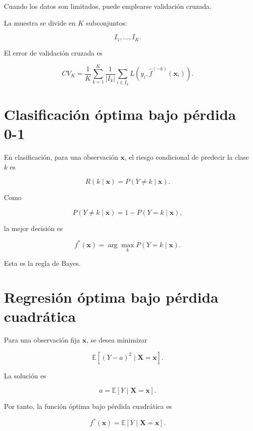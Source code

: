 \documentclass[
  spanish,
  10.5pt,
  letterpaper,
  DIV=11,
  numbers=noendperiod,
  oneside,
  open=any]{scrreprt}
\theoremstyle{definition}
\theoremstyle{definition}
\theoremstyle{plain}
\theoremstyle{remark}
\begin{document}

Cuando los datos son limitados, puede emplearse validación cruzada.

La muestra se divide en \(K\) subconjuntos:

\[
I_1,\ldots,I_K.
\]

El error de validación cruzada es

\[
CV_K
=
\frac{1}{K}
\sum_{k=1}^{K}
\frac{1}{|I_k|}
\sum_{i\in I_k}
L
\left(
y_i,
\widehat{f}^{(-k)}(\mathbf{x}_i)
\right).
\]

\section*{Clasificación óptima bajo pérdida
0-1}\label{clasificaciuxf3n-uxf3ptima-bajo-puxe9rdida-0-1}


En clasificación, para una observación \(\mathbf{x}\), el riesgo
condicional de predecir la clase \(k\) es

\[
R(k\mid\mathbf{x})
=
P(Y\neq k\mid\mathbf{x}).
\]

Como

\[
P(Y\neq k\mid\mathbf{x})
=
1-P(Y=k\mid\mathbf{x}),
\]

la mejor decisión es

\[
f^{*}(\mathbf{x})
=
\arg\max_k
P(Y=k\mid\mathbf{x}).
\]

Esta es la regla de Bayes.

\section*{Regresión óptima bajo pérdida
cuadrática}\label{regresiuxf3n-uxf3ptima-bajo-puxe9rdida-cuadruxe1tica}


Para una observación fija \(\mathbf{x}\), se desea minimizar

\[
\mathbb{E}
\left[
(
Y-a
)^2
\mid
\mathbf{X}=\mathbf{x}
\right].
\]

La solución es

\[
a
=
\mathbb{E}
[
Y\mid\mathbf{X}=\mathbf{x}
].
\]

Por tanto, la función óptima bajo pérdida cuadrática es

\[
f^{*}(\mathbf{x})
=
\mathbb{E}
[
Y\mid\mathbf{X}=\mathbf{x}
].
\]
\end{document}
